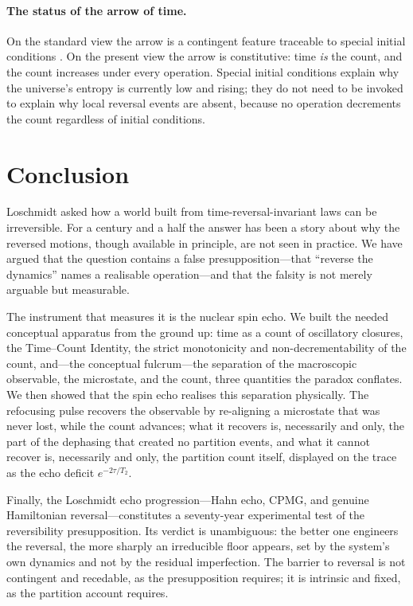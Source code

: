 \documentclass[11pt,a4paper]{article}
\theoremstyle{thmstyle}
\theoremstyle{definition}
\theoremstyle{remark}
\newcommand{\Ttwo}{T_{2}}
\begin{document}
\paragraph{The status of the arrow of time.} On the standard view the
arrow is a contingent feature traceable to special initial conditions
\citep{penrose2004,price1996,zeh2007}. On the present view the arrow is
constitutive: time \emph{is} the count, and the count increases under
every operation. Special initial conditions explain why the universe's
entropy is currently low and rising; they do not need to be invoked to
explain why local reversal events are absent, because no operation
decrements the count regardless of initial conditions.

\section{Conclusion}
\label{sec:conclusion}

Loschmidt asked how a world built from time-reversal-invariant laws can
be irreversible. For a century and a half the answer has been a story
about why the reversed motions, though available in principle, are not
seen in practice. We have argued that the question contains a false
presupposition---that ``reverse the dynamics'' names a realisable
operation---and that the falsity is not merely arguable but measurable.

The instrument that measures it is the nuclear spin echo. We built the
needed conceptual apparatus from the ground up: time as a count of
oscillatory closures, the Time--Count Identity, the strict monotonicity
and non-decrementability of the count, and---the conceptual fulcrum---the
separation of the macroscopic observable, the microstate, and the count,
three quantities the paradox conflates. We then showed that the spin echo
realises this separation physically. The refocusing pulse recovers the
observable by re-aligning a microstate that was never lost, while the
count advances; what it recovers is, necessarily and only, the part of
the dephasing that created no partition events, and what it cannot
recover is, necessarily and only, the partition count itself, displayed
on the trace as the echo deficit $e^{-2\tau/\Ttwo}$.

Finally, the Loschmidt echo progression---Hahn echo, CPMG, and genuine
Hamiltonian reversal---constitutes a seventy-year experimental test of
the reversibility presupposition. Its verdict is unambiguous: the better
one engineers the reversal, the more sharply an irreducible floor
appears, set by the system's own dynamics and not by the residual
imperfection. The barrier to reversal is not contingent and recedable, as
the presupposition requires; it is intrinsic and fixed, as the partition
account requires.
\end{document}
